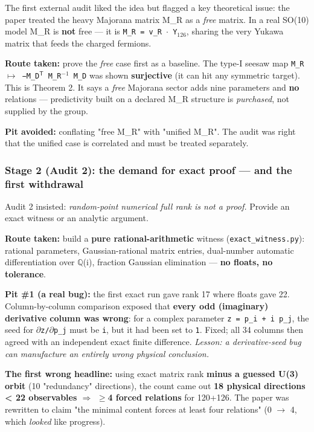 \documentclass[11pt]{article}
\begin{document}
The first external audit liked the idea but flagged a key theoretical issue: the
paper treated the heavy Majorana matrix M\_R as a \emph{free} matrix. In a real SO(10)
model M\_R is \textbf{not} free --- it is \texttt{M\_R = v\_R $\cdot$ Y$_{126}$}, sharing the very Yukawa matrix
that feeds the charged fermions.

\textbf{Route taken:} prove the \emph{free} case first as a baseline. The type-I seesaw map
\texttt{M\_R $\mapsto$ −M\_D$^{\mathsf T}$ M\_R$^{-1}$ M\_D} was shown \textbf{surjective} (it can hit any symmetric target).
This is Theorem 2. It says a \emph{free} Majorana sector adds nine parameters and \textbf{no}
relations --- predictivity built on a declared M\_R structure is \emph{purchased}, not
supplied by the group.

\textbf{Pit avoided:} conflating "free M\_R" with "unified M\_R". The audit was right that
the unified case is correlated and must be treated separately.

\subsubsection*{Stage 2 (Audit 2): the demand for exact proof --- and the first withdrawal}

Audit 2 insisted: \emph{random-point numerical full rank is not a proof.} Provide an
exact witness or an analytic argument.

\textbf{Route taken:} build a \textbf{pure rational-arithmetic} witness (\texttt{exact\_witness.py}):
rational parameters, Gaussian-rational matrix entries, dual-number automatic
differentiation over $\mathbb{Q}$(i), fraction Gaussian elimination --- \textbf{no floats, no
tolerance}.

\textbf{Pit \#1 (a real bug):} the first exact run gave rank 17 where floats gave 22.
Column-by-column comparison exposed that \textbf{every odd (imaginary) derivative column
was wrong}: for a complex parameter \texttt{z = p\_i + i p\_j}, the seed for \texttt{$\partial$z/$\partial$p\_j} must
be \texttt{i}, but it had been set to \texttt{1}. Fixed; all 34 columns then agreed with an
independent exact finite difference. \emph{Lesson: a derivative-seed bug can manufacture
an entirely wrong physical conclusion.}

\textbf{The first wrong headline:} using exact matrix rank \textbf{minus a guessed U(3) orbit}
(10 "redundancy" directions), the count came out \textbf{18 physical directions < 22
observables $\Rightarrow$ $\geq$4 forced relations} for 120+126. The paper was rewritten to claim
"the minimal content forces at least four relations" (0 $\rightarrow$ 4, which \emph{looked} like
progress).
\end{document}
